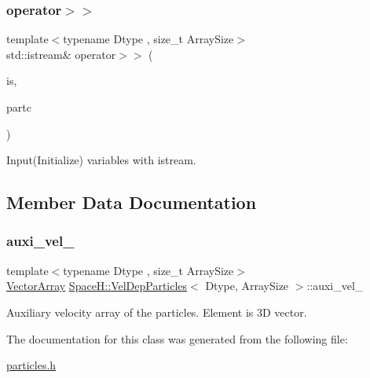 \subsubsection{\texorpdfstring{operator$>$$>$}{operator>>}}
{\footnotesize\ttfamily template$<$typename Dtype , size\+\_\+t Array\+Size$>$ \\
std\+::istream\& operator$>$$>$ (\begin{DoxyParamCaption}\item[{std\+::istream \&}]{is,  }\item[{\mbox{\hyperlink{class_space_h_1_1_vel_dep_particles}{Vel\+Dep\+Particles}}$<$ Dtype, Array\+Size $>$ \&}]{partc }\end{DoxyParamCaption})\hspace{0.3cm}{\ttfamily [friend]}}



Input(\+Initialize) variables with istream. 



\subsection{Member Data Documentation}
\mbox{\label{class_space_h_1_1_vel_dep_particles_afad94e7b131f91c60ff1775fe85ce05a}} 
\subsubsection{\texorpdfstring{auxi\+\_\+vel\+\_\+}{auxi\_vel\_}}
{\footnotesize\ttfamily template$<$typename Dtype , size\+\_\+t Array\+Size$>$ \\
\mbox{\hyperlink{class_space_h_1_1_vel_indep_particles_aa9983058940249df8b00fa800e8cbad2}{Vector\+Array}} \mbox{\hyperlink{class_space_h_1_1_vel_dep_particles}{Space\+H\+::\+Vel\+Dep\+Particles}}$<$ Dtype, Array\+Size $>$\+::auxi\+\_\+vel\+\_\+\hspace{0.3cm}{\ttfamily [protected]}}



Auxiliary velocity array of the particles. Element is 3D vector. 



The documentation for this class was generated from the following file\+:\begin{DoxyCompactItemize}
\item 
\mbox{\hyperlink{particles_8h}{particles.\+h}}\end{DoxyCompactItemize}
